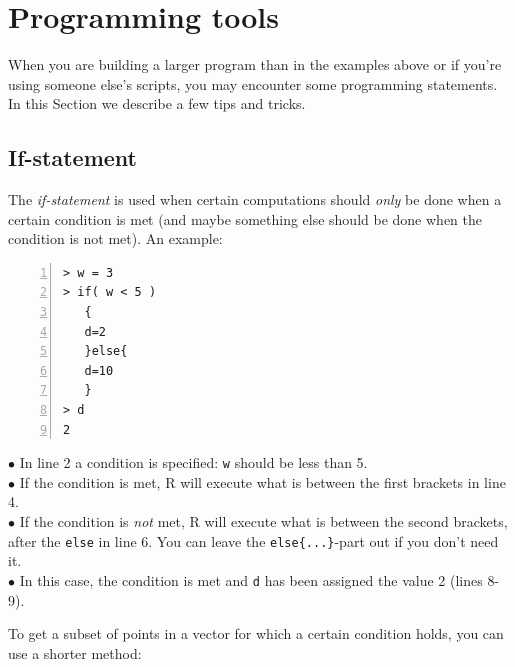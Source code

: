 \documentclass[a4paper,11pt,twocolumn,tablecaptionabove]{scrartcl}
\begin{document}


\section{Programming tools}

When you are building a larger program than in the examples above or if you're using someone else's scripts, you may encounter some programming statements. In this Section we describe a few tips and tricks.

\subsection{If-statement}

The \emph{if-statement} is used when certain computations should \emph{only} be done when a certain condition is met (and maybe something else should be done when the condition is not met). An example:

\begin{Verbatim}[frame=single,numbers=left,gobble=0, xleftmargin=0.35cm, numbersep=0.1cm]
> w = 3
> if( w < 5 )
   {
   d=2
   }else{
   d=10
   }
> d
2
\end{Verbatim}

\noindent $\bullet$ In line 2 a condition is specified: \texttt{w} should be less than 5.\\
\noindent $\bullet$ If the condition is met, R will execute what is between the first brackets in line 4.\\
\noindent $\bullet$ If the condition is \emph{not} met, R will execute what is between the second brackets, after the \texttt{else} in line 6. You can leave the \verb!else{...}!-part out if you don't need it.\\
\noindent $\bullet$ In this case, the condition is met and \texttt{d} has been assigned the value 2 (lines 8-9).

To get a subset of points in a vector for which a certain condition holds, you can use a shorter method:
\end{document}
